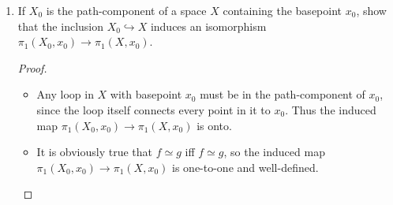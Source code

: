 \documentclass[12pt,letterpaper]{article}
\begin{document}
\begin{enumerate}
\begin{proof}
$$P\sqcdot H \sqcdot \bar{P}$$
to obtain an actual homotopy of loops showing $f\simeq p\sqcdot g\sqcdot \bar{p}$. To see that we have done this, observe that for all time the endpoints are fixed at $x_0$, at $t=0$ we have $\{x_0\}\sqcdot f \sqcdot \{x_0\} \simeq f$, and at $t=1$ we have $p\sqcdot g \sqcdot \bar{p}$.
\end{proof}
\begin{proof}(iii)
Consider the map induced by $\Phi$, 
$$\tilde{\Phi}:\{\text{conjugacy classes of }\pi_1(X)\}\to [S^1,X].$$
\begin{itemize}
\item Since $\Phi$ is onto, then $\tilde{\Phi}$ is onto.
\item Since $\Phi([f])=\Phi([g])$ implies $[f]$ and $[g]$ are conjugate, then $\tilde{\Phi}$ is one-to-one.
\item Since $[f]$ and $[g]$ are conjugate implies $\Phi([f])=\Phi([g])$, then $\tilde{\Phi}$ is well-defined. \qedhere
\end{itemize}
\end{proof}

\setcounter{enumi}{10}
\item If $X_0$ is the path-component of a space $X$ containing the basepoint $x_0$, show that the inclusion $X_0\hookrightarrow X$ induces an isomorphism $\pi_1(X_0,x_0)\to \pi_1(X,x_0)$. 
\begin{proof}\mbox{}
\begin{itemize}
\item Any loop in $X$ with basepoint $x_0$ must be in the path-component of $x_0$, since the loop itself connects every point in it to $x_0$. Thus the induced map $\pi_1(X_0,x_0)\to \pi_1(X,x_0)$ is onto. 
\item It is obviously true that $f\simeq g$ iff $f\simeq g$, so the induced map $\pi_1(X_0,x_0)\to \pi_1(X,x_0)$ is one-to-one and well-defined. \qedhere
\end{itemize}
\end{proof}


\end{enumerate}
\end{document}
